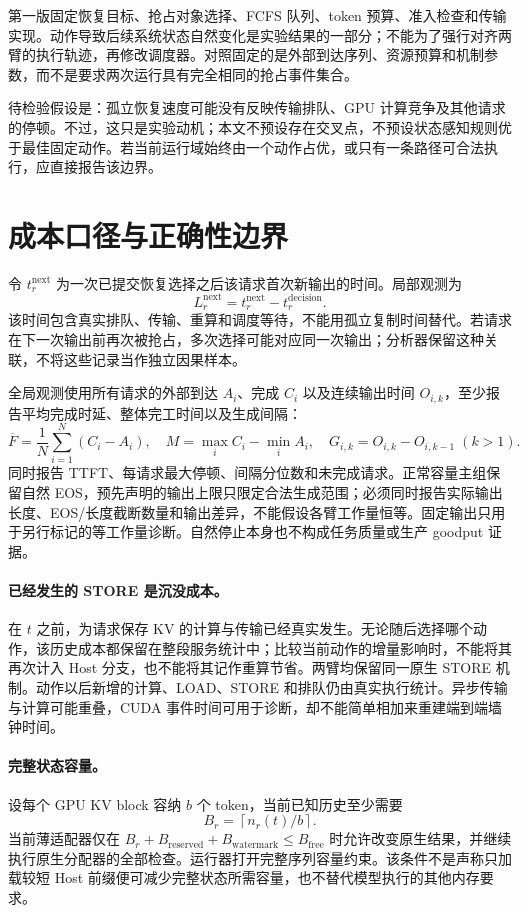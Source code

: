 \documentclass[UTF8,fontset=fandol,a4paper,10pt]{ctexart}
\begin{document}
第一版固定恢复目标、抢占对象选择、FCFS 队列、token 预算、准入检查和传输实现。动作导致后续系统状态自然变化是实验结果的一部分；不能为了强行对齐两臂的执行轨迹，再修改调度器。对照固定的是外部到达序列、资源预算和机制参数，而不是要求两次运行具有完全相同的抢占事件集合。

待检验假设是：孤立恢复速度可能没有反映传输排队、GPU 计算竞争及其他请求的停顿。不过，这只是实验动机；本文不预设存在交叉点，不预设状态感知规则优于最佳固定动作。若当前运行域始终由一个动作占优，或只有一条路径可合法执行，应直接报告该边界。

\section{成本口径与正确性边界}
\label{sec:cost}
令 $t_r^{\mathrm{next}}$ 为一次已提交恢复选择之后该请求首次新输出的时间。局部观测为
\begin{equation}
 L_r^{\mathrm{next}}=t_r^{\mathrm{next}}-t_r^{\mathrm{decision}}.
\end{equation}
该时间包含真实排队、传输、重算和调度等待，不能用孤立复制时间替代。若请求在下一次输出前再次被抢占，多次选择可能对应同一次输出；分析器保留这种关联，不将这些记录当作独立因果样本。

全局观测使用所有请求的外部到达 $A_i$、完成 $C_i$ 以及连续输出时间 $O_{i,k}$，至少报告平均完成时延、整体完工时间以及生成间隔：
\begin{equation}
 \overline F=\frac{1}{N}\sum_{i=1}^N(C_i-A_i),\quad
 M=\max_i C_i-\min_i A_i,\quad
 G_{i,k}=O_{i,k}-O_{i,k-1}\;(k>1).
\end{equation}
同时报告 TTFT、每请求最大停顿、间隔分位数和未完成请求。正常容量主组保留自然 EOS，预先声明的输出上限只限定合法生成范围；必须同时报告实际输出长度、EOS/长度截断数量和输出差异，不能假设各臂工作量恒等。固定输出只用于另行标记的等工作量诊断。自然停止本身也不构成任务质量或生产 goodput 证据。

\paragraph{已经发生的 STORE 是沉没成本。}
在 $t$ 之前，为请求保存 KV 的计算与传输已经真实发生。无论随后选择哪个动作，该历史成本都保留在整段服务统计中；比较当前动作的增量影响时，不能将其再次计入 Host 分支，也不能将其记作重算节省。两臂均保留同一原生 STORE 机制。动作以后新增的计算、LOAD、STORE 和排队仍由真实执行统计。异步传输与计算可能重叠，CUDA 事件时间可用于诊断，却不能简单相加来重建端到端墙钟时间。

\paragraph{完整状态容量。}
设每个 GPU KV block 容纳 $b$ 个 token，当前已知历史至少需要
\begin{equation}
 B_r=\left\lceil n_r(t)/b\right\rceil.
\end{equation}
当前薄适配器仅在 $B_r+B_{\mathrm{reserved}}+B_{\mathrm{watermark}}\le B_{\mathrm{free}}$ 时允许改变原生结果，并继续执行原生分配器的全部检查。运行器打开完整序列容量约束。该条件不是声称只加载较短 Host 前缀便可减少完整状态所需容量，也不替代模型执行的其他内存要求。
\end{document}
